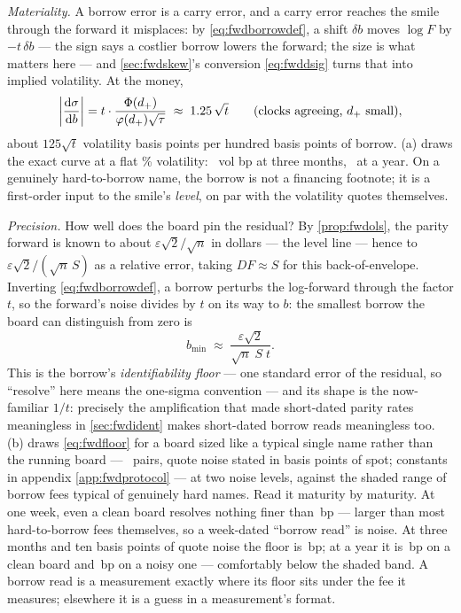 \emph{Materiality.}  A borrow error is a carry error, and a carry
error reaches the smile through the forward it misplaces:
by \eqref{eq:fwdborrowdef}, a shift $\delta b$ moves $\log F$ by
$-t\,\delta b$ --- the sign says a costlier borrow lowers the
forward; the size is what matters here --- and
\cref{sec:fwdskew}'s conversion \eqref{eq:fwddsig}
turns that into implied volatility.  At the money,
\begin{equation}
\bigg|\frac{\mathrm{d}\sigma}{\mathrm{d} b}\bigg|
=t\cdot\frac{\Phi(d_+)}{\varphi(d_+)\sqrt\tau}
\;\approx\;1.25\,\sqrt t
\qquad(\text{clocks agreeing, }d_+\text{ small}),
\label{eq:fwdbsens}
\end{equation}
about $125\sqrt t$ volatility basis points per hundred basis points
of borrow.  (a) draws the exact curve at a flat
\MacFwdBorrowSigmaPct\% volatility: \MacFwdBorrowSensQBp\ vol bp at
three months, \MacFwdBorrowSensYBp\ at a year.  On a genuinely
hard-to-borrow name, the borrow is not a financing footnote; it is a
first-order input to the smile's \emph{level}, on par with the
volatility quotes themselves.

\emph{Precision.}  How well does the board pin the residual?  By
\cref{prop:fwdols}, the parity forward is known to about
$\varepsilon\sqrt2/\sqrt n$ in dollars --- the level line --- hence
to $\varepsilon\sqrt2/(\sqrt n\,S)$ as a relative error, taking
$DF\approx S$ for this back-of-envelope.  Inverting
\eqref{eq:fwdborrowdef}, a borrow perturbs the log-forward through
the factor $t$, so the forward's noise divides by $t$ on its way to
$b$: the smallest borrow the board can distinguish from zero is
\begin{equation}
b_{\min}
\;\approx\;\frac{\varepsilon\sqrt2}{\sqrt n\;S\;t}.
\label{eq:fwdfloor}
\end{equation}
This is the borrow's \emph{identifiability floor} --- one standard
error of the residual, so ``resolve'' here means the one-sigma
convention --- and its shape is the now-familiar $1/t$: precisely
the amplification that made short-dated parity rates meaningless in
\cref{sec:fwdident} makes short-dated borrow reads meaningless too.
(b) draws \eqref{eq:fwdfloor} for a board sized
like a typical single name rather than the running board ---
\MacFwdBorrowNPairs\ pairs, quote noise stated in basis points of
spot; constants in appendix \ref{app:fwdprotocol} --- at two noise
levels, against the shaded range of borrow fees typical of genuinely
hard names.  Read it
maturity by maturity.  At one week, even a clean board resolves
nothing finer than \MacFwdBorrowFloorWeekBp\,bp --- larger than most
hard-to-borrow fees themselves, so a week-dated ``borrow read'' is
noise.  At three months and ten basis points of quote
noise the floor is \MacFwdBorrowFloorQBp\,bp; at a year it is
\MacFwdBorrowFloorYBp\,bp on a clean board and
\MacFwdBorrowFloorWideYBp\,bp on a noisy one --- comfortably below
the shaded band.  A borrow read is a measurement exactly where its
floor sits under the fee it measures; elsewhere it is a
guess in a measurement's format.

